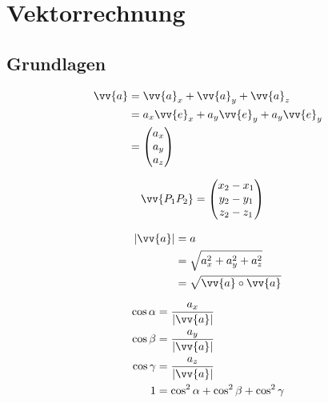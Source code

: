 \section{Vektorrechnung}
\subsection{Grundlagen}

\begin{boxleft}
\end{boxleft}\begin{boxrightshaded}
\begin{align} 
\vv{a}	&=\vv{a}_x+\vv{a}_y+\vv{a}_z\\
	&=a_x\vv{e}_x+a_y\vv{e}_y+a_y\vv{e}_y\\
	&=\begin{pmatrix} a_x\\ a_y\\a_z\end{pmatrix}
\end{align}\end{boxrightshaded}

\begin{boxleft}
\end{boxleft}\begin{boxrightshaded}
\begin{align} 
\vv{P_1P_2} &=\begin{pmatrix} x_2-x_1\\ y_2-y_1\\z_2-z_1\end{pmatrix}
\end{align}\end{boxrightshaded}

\begin{boxleft}
\end{boxleft}\begin{boxrightshaded}
\begin{align} 
|\vv{a}|	&=a\\
		&=\sqrt{a_x^2+a_y^2+a_z^2}\\
		&=\sqrt{\vv{a}\circ\vv{a}}
\end{align}\end{boxrightshaded}

\begin{boxleft}
\end{boxleft}\begin{boxrightshaded}
\begin{align} 
\cos \alpha &= \frac{a_x}{|\vv{a}|}\\
\cos \beta &= \frac{a_y}{|\vv{a}|}\\
\cos \gamma &= \frac{a_z}{|\vv{a}|}\\
1&=\cos^2\alpha+\cos^2\beta+\cos^2\gamma
\end{align}\end{boxrightshaded}

